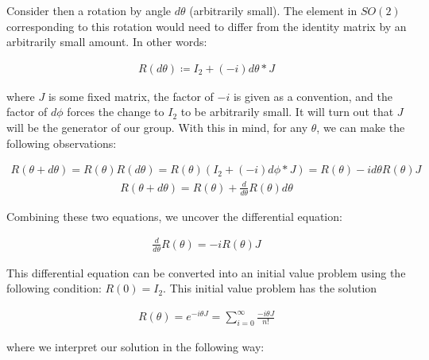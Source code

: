 \documentclass[10pt]{ucthesis}
\begin{document}
Consider then a rotation by angle $d\theta$ (arbitrarily small). The element in $SO(2)$ corresponding to this rotation would need to differ from the identity matrix by an arbitrarily small amount. In other words:

\begin{equation}
	\begin{aligned}
		R(d\theta) \coloneq I_2 + (-i)d\theta * J
	\end{aligned}
\end{equation}  

where $J$ is some fixed matrix, the factor of $-i$ is given as a convention, and the factor of $d\phi$ forces the change to $I_2$ to be arbitrarily small. It will turn out that $J$ will be the generator of our group. With this in mind, for any $\theta$, we can make the following observations:

\begin{equation}
	\begin{aligned}
		R(\theta + d\theta) = R(\theta)R(d\theta) = R(\theta)\left(I_2 + (-i)d\phi * J\right) = R(\theta) - id\theta R(\theta)J
	\end{aligned}
\end{equation}  
\begin{equation}
	\begin{aligned}
		R(\theta + d\theta) = R(\theta) + \frac{d}{d\theta}R(\theta)d\theta
	\end{aligned}
\end{equation}  

Combining these two equations, we uncover the differential equation:

\begin{equation}
	\begin{aligned}
		\frac{d}{d\theta}R(\theta) = - i R(\theta)J
	\end{aligned}
\end{equation}  

This differential equation can be converted into an initial value problem using the following condition: $R(0) = I_2$. This initial value problem has the solution

\begin{equation}
	\begin{aligned}
		R(\theta) = e^{-i\theta J} = \sum_{i=0}^\infty \frac{-i\theta J}{n!}
	\end{aligned}
\end{equation}  

where we interpret our solution in the following way:
\end{document}
